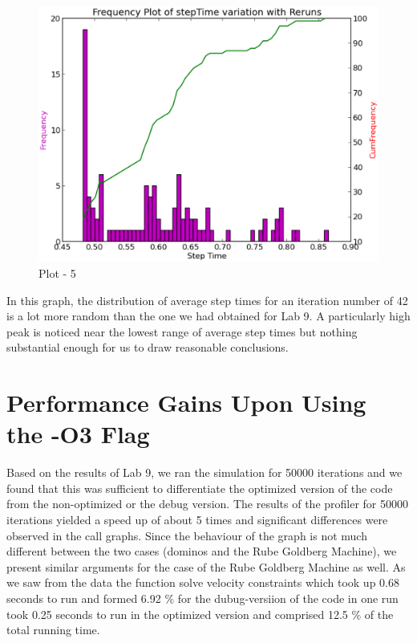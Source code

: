 \documentclass[11pt] {article}
\begin{document}
\begin {figure} [ht]
\begin {center}
\includegraphics[scale = 0.35] {6.eps}
\end {center}
\caption {Plot - 5}
\end {figure}

In this graph, the distribution of average step times for an iteration number of 42 is a lot more 
random than the one we had obtained for Lab 9. A particularly high peak is noticed near the lowest
range of average step times but nothing substantial enough for us to draw reasonable conclusions.

\section{Performance Gains Upon Using the -O3 Flag}\cite{3,4}

Based on the results of Lab 9, we ran the simulation for 50000 iterations and we found that this
was sufficient to differentiate the optimized version of the code from the non-optimized or the
debug version. The results of the profiler for 50000 iterations yielded a speed up of about 5 times
and significant differences were observed in the call graphs. Since the behaviour of the graph is
not much different between the two cases (dominos and the Rube Goldberg Machine), we present
similar arguments for the case of the Rube Goldberg Machine as well. As we saw from the data
the function solve velocity constraints which took up 0.68 seconds to run and formed 6.92 \% for 
the dubug-versiion of the code in one run took 0.25 seconds to run in the optimized version and 
comprised 12.5 \% of the total running time.
\end{document}
